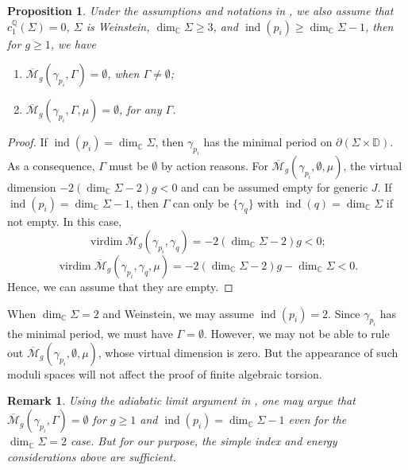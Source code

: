 \documentclass[11pt]{amsart}
\numberwithin{equation}{section}
\newtheorem{proposition}[theorem]{\textbf{Proposition}}
\newtheorem{remark}[theorem]{\textbf{Remark}}
\def\C{{\mathbb C}}
\def\D{{\mathbb D}}
\def\Q{{\mathbb Q}}
\def\cM{{\mathcal M}}
\DeclareMathOperator{\ind}{ind}
\DeclareMathOperator{\virdim}{virdim}
\begin{document}
\begin{proposition}\label{prop:curve_genus}
Under the assumptions and notations in , we also assume that $c^{\Q}_1(\Sigma)=0$, $\Sigma$ is Weinstein, $\dim_{\C}\Sigma \ge 3$, and $\ind(p_i)\ge \dim_{\C}\Sigma-1$, then for $g\ge 1$, we have
\begin{enumerate}
    \item $\overline{\cM}_g(\gamma_{p_i},\Gamma)=\emptyset$, when $\Gamma\ne \emptyset$;
    \item $\overline{\cM}_g(\gamma_{p_i},\Gamma,\mu)=\emptyset$, for any $\Gamma$. 
\end{enumerate}
\end{proposition}
\begin{proof}
If $\ind(p_i)=\dim_{\C}\Sigma$, then $\gamma_{p_i}$ has the minimal period on $\partial(\Sigma \times \D)$. As a consequence, $\Gamma$ must be $\emptyset$ by action reasons. For $\overline{\cM}_{g}(\gamma_{p_i},\emptyset,\mu)$, the virtual dimension $-2(\dim_{\C}\Sigma-2)g<0$ and can be assumed empty for generic $J$. If $\ind(p_i)=\dim_{\C}\Sigma-1$, then $\Gamma$ can only be $\{\gamma_q\}$ with $\ind(q)=\dim_{\C}\Sigma$ if not empty. In this case, 
$$\virdim \overline{\cM}_g(\gamma_{p_i},\gamma_q)=-2(\dim_{\C}\Sigma-2)g<0;$$
$$\virdim \overline{\cM}_g(\gamma_{p_i},\gamma_q,\mu)=-2(\dim_{\C}\Sigma-2)g-\dim_{\C}\Sigma<0.$$
Hence, we can assume that they are empty. 
\end{proof}
When $\dim_{\C} \Sigma = 2$ and Weinstein, we may assume $\ind(p_i)=2$. Since $\gamma_{p_i}$ has the minimal period, we must have $\Gamma=\emptyset$. However, we may not be able to rule out $\overline{\cM}_g(\gamma_{p_i},\emptyset,\mu)$, whose virtual dimension is zero. But the appearance of such moduli spaces will not affect the proof of finite algebraic torsion. 

\begin{remark}
    Using the adiabatic limit argument in \cite[\S 2]{moreno2019algebraic}, one may argue that $\overline{\cM}_{g}(\gamma_{p_i},\Gamma)=\emptyset$ for $g\ge 1$ and $\ind(p_i)=\dim_{\C}\Sigma-1$ even for the $\dim_{\C}\Sigma=2$ case. But for our purpose, the simple index and energy considerations above are sufficient. 
\end{remark}
\end{document}
